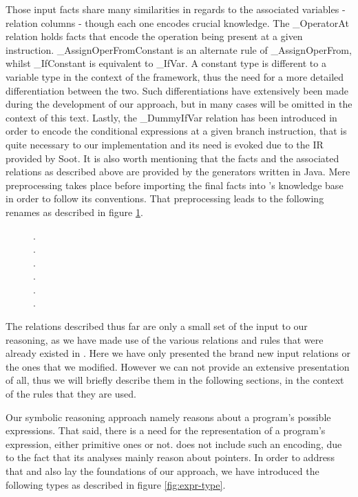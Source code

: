 Those input facts share many similarities in regards to the associated
variables - relation columns - though each one encodes crucial knowledge.
The \_OperatorAt relation holds facts that encode the operation being present
at a given instruction. \_AssignOperFromConstant is an alternate rule of \_AssignOperFrom,
whilst \_IfConstant is equivalent to \_IfVar. A constant type is different to a variable type
in the context of the framework, thus the need for a more detailed differentiation between the
two. Such differentiations have extensively been made during the development of our approach, but
in many cases will be omitted in the context of this text.
Lastly, the \_DummyIfVar relation has been introduced in order to encode the conditional
expressions at a given branch instruction, that is quite necessary to our implementation
and its need is evoked due to the IR provided by Soot. It is also worth mentioning that
the facts and the associated relations as described above are provided by the generators
written in Java. Mere preprocessing takes place before importing the final facts into \doop{}'s
knowledge base in order to follow its conventions. That preprocessing leads to the following
renames as described in figure \ref{fig:imported-facts}.

\begin{figure}[th]
  .\\
  .\\
  .\\
  .\\
  .\\
  .\\
  \label{fig:imported-facts}
\end{figure}

The relations described thus far are only a small set of the input to our reasoning, as we have
made use of the various relations and rules that were already existed in \doop{}. Here we have
only presented the brand new input relations or the ones that we modified. However we can
not provide an extensive presentation of all, thus we will briefly describe them in the
following sections, in the context of the rules that they are used.

Our symbolic reasoning approach namely reasons about a program's possible expressions. That
said, there is a need for the representation of a program's expression, either primitive ones
or not. \doop{} does not include such an encoding, due to the fact that its analyses mainly
reason about pointers. In order to address that and also lay the foundations of our approach,
we have introduced the following types as described in figure \ref{fig:expr-type}.

